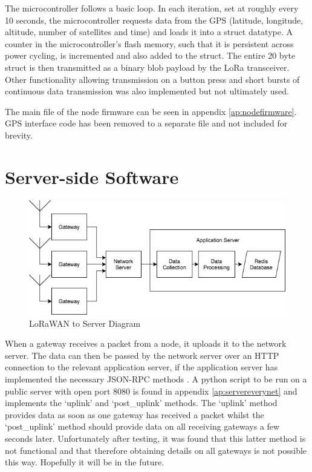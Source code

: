 \documentclass[a4paper]{report}
\begin{document}
    The microcontroller follows a basic loop. In each iteration, set at roughly every 10 seconds, the microcontroller requests data from the GPS (latitude, longitude, altitude, number of satellites and time) and loads it into a struct datatype. A counter in the microcontroller's flash memory, such that it is persistent across power cycling, is incremented and also added to the struct. The entire 20 byte struct is then transmitted as a binary blob payload by the LoRa transceiver. Other functionality allowing transmission on a button press and short bursts of continuous data transmission was also implemented but not ultimately used.

    The main file of the node firmware can be seen in appendix \ref{ap:nodefirmware}. GPS interface code has been removed to a separate file and not included for brevity.


  \section{Server-side Software}

    \begin{figure}
    \centering
    \includegraphics[width=12cm]{figures/server.jpeg}
    \caption{LoRaWAN to Server Diagram}
    \label{fig:server}
    \end{figure}

    When a gateway receives a packet from a node, it uploads it to the network server. The data can then be passed by the network server over an HTTP connection to the relevant application server, if the application server has implemented the necessary JSON-RPC methods \cite{EverynetAPI}. A python script to be run on a public server with open port 8080 is found in appendix \ref{ap:servereverynet} and implements the `uplink' and `post\_uplink' methods. The `uplink' method provides data as soon as one gateway has received a packet whilst the `post\_uplink' method should provide data on all receiving gateways a few seconds later. Unfortunately after testing, it was found that this latter method is not functional and that therefore obtaining details on all gateways is not possible this way. Hopefully it will be in the future.
\end{document}
